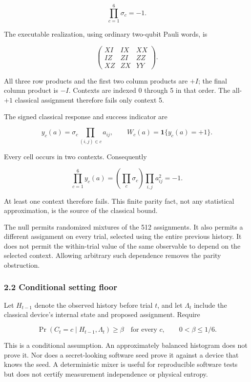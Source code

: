 \documentclass[10pt,a4paper]{article}
\begin{document}
\[
\prod_{c=1}^{6}\sigma_c=-1.
\]

The executable realization, using ordinary two-qubit Pauli words, is

\[
\begin{pmatrix}
XI&IX&XX\\
IZ&ZI&ZZ\\
XZ&ZX&YY
\end{pmatrix}.
\]

All three row products and the first two column products are \(+I\); the
final column product is \(-I\). Contexts are indexed 0 through 5 in that
order. The all-\(+1\) classical assignment therefore fails only context
5.

The signed classical response and success indicator are

\[
y_c(a)=\sigma_c\prod_{(i,j)\in c}a_{ij},
\qquad
W_c(a)=\mathbf 1\{y_c(a)=+1\}.
\]

Every cell occurs in two contexts. Consequently

\[
\prod_{c=1}^{6}y_c(a)
=\left(\prod_c\sigma_c\right)\prod_{i,j}a_{ij}^2
=-1. \tag{1}
\]

At least one context therefore fails. This finite parity fact, not any
statistical approximation, is the source of the classical bound.

The null permits randomized mixtures of the 512 assignments. It also
permits a different assignment on every trial, selected using the entire
previous history. It does not permit the within-trial value of the same
observable to depend on the selected context. Allowing arbitrary such
dependence removes the parity obstruction.

\subsubsection{2.2 Conditional setting
floor}\label{conditional-setting-floor}

Let \(H_{t-1}\) denote the observed history before trial \(t\), and let
\(\Lambda_t\) include the classical device's internal state and proposed
assignment. Require

\[
\Pr(C_t=c\mid H_{t-1},\Lambda_t)\ge\beta
\quad\text{for every }c, \qquad 0<\beta\le1/6. \tag{2}
\]

This is a conditional assumption. An approximately balanced histogram
does not prove it. Nor does a secret-looking software seed prove it
against a device that knows the seed. A deterministic mixer is useful
for reproducible software tests but does not certify measurement
independence or physical entropy.
\end{document}
